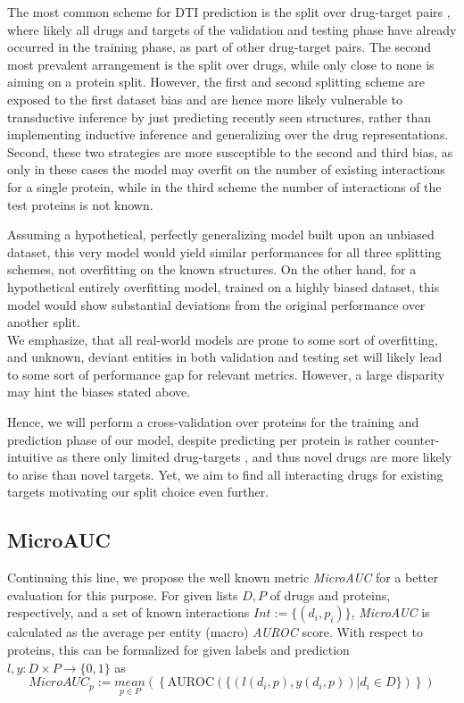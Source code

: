 \documentclass{bioinfo}
\begin{document}
The most common scheme for DTI prediction is the split over drug-target pairs \citep{Survey2018}, where likely all drugs and targets of the validation and testing phase have already occurred in the training phase, as part of other drug-target pairs. The second most prevalent arrangement is the split over drugs, while only close to none is aiming on a protein split.  However, the first and second splitting scheme are exposed to the first dataset bias and are hence more likely vulnerable to transductive inference by just predicting recently seen structures, rather than implementing inductive inference and generalizing over the drug representations. Second, these two strategies are more susceptible to the second and third bias, as only in these cases the model may overfit on the number of existing interactions for a single protein, while in the third scheme the number of interactions of the test proteins is not known. 

Assuming a hypothetical, perfectly generalizing model built upon an unbiased dataset, this very model would yield similar performances for all three splitting schemes, not overfitting on the known structures. On the other hand, for a hypothetical entirely overfitting model, trained on a highly biased dataset, this model would show substantial deviations from the original performance over another split. \\
We emphasize, that all real-world models are prone to some sort of overfitting, and unknown, deviant entities in both validation and testing set will likely lead to some sort of performance gap for relevant metrics. However, a large disparity may hint the biases stated above.

Hence, we will perform a cross-validation over proteins for the training and prediction phase of our model, despite predicting per protein is rather counter-intuitive as there only limited drug-targets \citep{Overington2006}, and thus novel drugs are more likely to arise than novel targets. Yet, we aim to find all interacting drugs for existing targets motivating our split choice even further.


\subsection{MicroAUC}
Continuing this line, we propose the well known metric \textit{MicroAUC} for a better evaluation for this purpose. For given lists $D, P$ of drugs and proteins, respectively, and a set of known interactions $Int := \{(d_i, p_i) \}$, \textit{MicroAUC} is calculated as the average per entity (macro) \textit{AUROC} score. With respect to proteins, this can be formalized for given labels and prediction $l,y:D\times P \rightarrow \{0,1\}$  as 
\begin{equation*}
	MicroAUC_p := \underset{p\in P}{mean}\left(\left\{ \text{AUROC}(\{ (l(d_i, p), y(d_i,p))| d_i\in D\}) \right\}\right)
\end{equation*}
\end{document}
